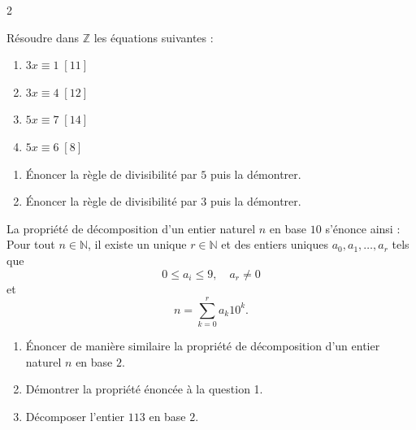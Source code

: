 \documentclass[a4paper,12pt]{article}
\begin{document}
\begin{multicols}{2}
    \begin{exercice}[title=Exercice 25 $\quad \star \quad$ { [Calculer] }]{}{}
    Résoudre dans $\mathbb{Z}$ les équations suivantes :
    \begin{enumerate}
        \item $3x \equiv 1 \; [11]$
        \item $3x \equiv 4 \; [12]$
        \item $5x \equiv 7 \; [14]$
        \item $5x \equiv 6 \; [8]$
    \end{enumerate}
    \end{exercice}
    
    \begin{exercice}[title=Exercice 26 $\quad \star \star \quad$ { [Communiquer, Raisonner] }]{}{}
    \begin{enumerate}
        \item Énoncer la règle de divisibilité par $5$ puis la démontrer.
        \item Énoncer la règle de divisibilité par $3$ puis la démontrer.
    \end{enumerate}
    \end{exercice}
    
    \begin{exercice}[title=Exercice 27 $\quad \star \star \star \quad$ { [Raisonner, Communiquer, Chercher] }]{}{}
    La propriété de décomposition d’un entier naturel $n$ en base $10$ s’énonce ainsi :
    Pour tout $n \in \mathbb{N}$, il existe un unique $r \in \mathbb{N}$ et des entiers uniques $a_0, a_1, \ldots, a_r$ tels que
    \[
    0 \leq a_i \leq 9, \quad a_r \neq 0
    \]
    et 
    \[
    n = \sum_{k=0}^r a_k 10^k.
    \]
    \begin{enumerate}
        \item Énoncer de manière similaire la propriété de décomposition d’un entier naturel $n$ en base $2$.
        \item Démontrer la propriété énoncée à la question 1.
        \item Décomposer l’entier $113$ en base $2$.
    \end{enumerate}
    \end{exercice}
    

\end{multicols}
\end{document}

